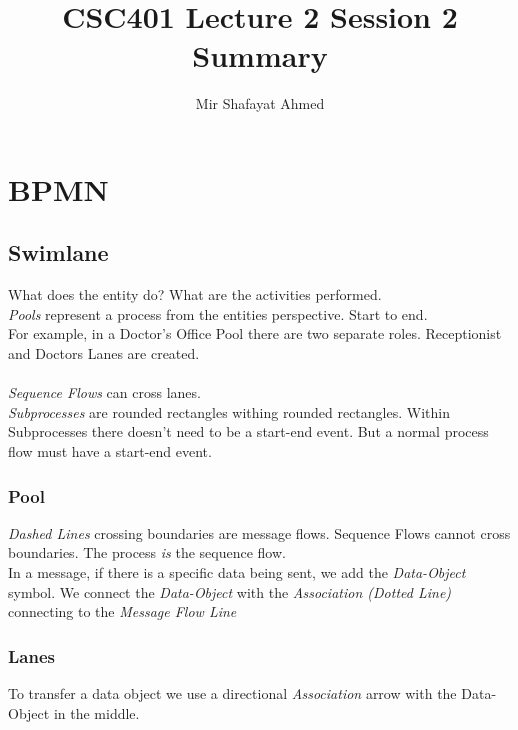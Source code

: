 \documentclass{article}
\title{CSC401 Lecture 2 Session 2 Summary}
\author{Mir Shafayat Ahmed}
\begin{document}
    \pagecolor[HTML]{FFFFCC}
    \maketitle

    \section{BPMN}
        \subsection{Swimlane}
            What does the entity do? What are the activities performed.\\
            \emph{Pools} represent a process from the entities perspective. Start to end.\\
            For example, in a Doctor's Office Pool there are two separate roles. Receptionist and Doctors Lanes are created.
            
            \paragraph{}
            \emph{Sequence Flows} can cross lanes.\\
            \emph{Subprocesses} are rounded rectangles withing rounded rectangles. Within Subprocesses there doesn't need to be a start-end event. But a normal process flow must have a start-end event.
            
            \subsubsection{Pool}
                \emph{Dashed Lines} crossing boundaries are message flows. Sequence Flows cannot cross boundaries. The process \emph{is} the sequence flow.\\
                In a message, if there is a specific data being sent, we add the \emph{Data-Object} symbol. We connect the \emph{Data-Object} with the \emph{Association (Dotted Line)} connecting to the \emph{Message Flow Line}
            
            \subsubsection{Lanes}
                To transfer a data object we use a directional \emph{Association} arrow with the Data-Object in the middle.
            
\end{document}
